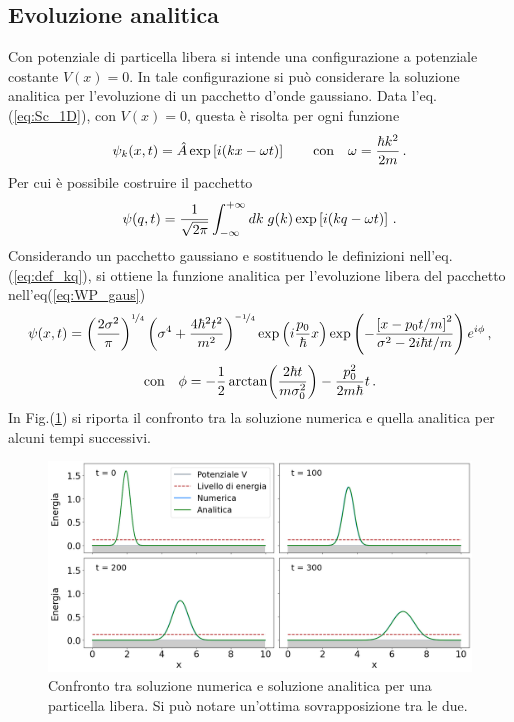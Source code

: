\documentclass[12pt]{report}
\begin{document}
\subsection{Evoluzione analitica}

Con potenziale di particella libera si intende una configurazione a potenziale costante $V(x) = 0$. In tale configurazione si può considerare la soluzione analitica per l'evoluzione di un pacchetto d'onde gaussiano. 
Data l'eq.(\ref{eq:Sc_1D}), con $V(x) = 0$, questa è risolta per ogni funzione
\begin{equation}
    \centering
    \psi_{k} (x, t) = \hat{A} \exp \left[i(kx - \omega t)\right] \qquad \text{con}  \quad \omega = \frac{\hbar k^2}{2m} \, \text{.}
    \label{eq:plane_wave}
\end{equation}
Per cui è possibile costruire il pacchetto
\begin{equation}
    \centering
    \psi(q,t) = \frac{1}{\sqrt{2 \pi}} \int_{- \infty}^{+ \infty} dk \; g(k) \exp \left[i(kq - \omega t)\right] \, \text{.}
    \label{eq:WP_ev}
\end{equation}
Considerando un pacchetto gaussiano e sostituendo le definizioni nell'eq.(\ref{eq:def_kq}), si ottiene la funzione analitica per l'evoluzione libera del pacchetto nell'eq(\ref{eq:WP_gaus}) 
\begin{equation}
    \centering
    \psi(x,t) = 
    \left( \frac{2 \sigma^2}{\pi} \right)^{\nicefrac{1}{4}} 
    \left( \sigma^4 + \frac{4 \hbar^2 t^2}{m^2}   \right)^{\nicefrac{-1}{4}}
    \exp \left(i \frac{p_0}{\hbar} x\right) 
    \exp \left( - \frac{\left[ x - p_0 t / m \right]^{2}} {\sigma^2 - 2 i \hbar t / m} \right)
    e^{i \phi} \, \text{,}
    \label{eq:WP_gaus_ev}
\end{equation}
\begin{equation}
    \centering
    \text{con} \quad \phi = - \frac{1}{2} \arctan (\frac{2 \hbar t}{m \sigma_0^2}) - \frac{p_0^2}{2 m \hbar} t  \, \text{.}
\end{equation}
In Fig.(\ref{fig:free_ev}) si riporta il confronto tra la soluzione numerica e quella analitica per alcuni tempi successivi.

\begin{figure}
    \centering
    \includegraphics[width = \textwidth]{immagini/free_ev.png}
    \caption{ \textcolor{dark-gray}{Confronto tra soluzione numerica e soluzione analitica per una particella libera. Si può notare un'ottima sovrapposizione tra le due.}}
    \label{fig:free_ev}
\end{figure}
\end{document}
